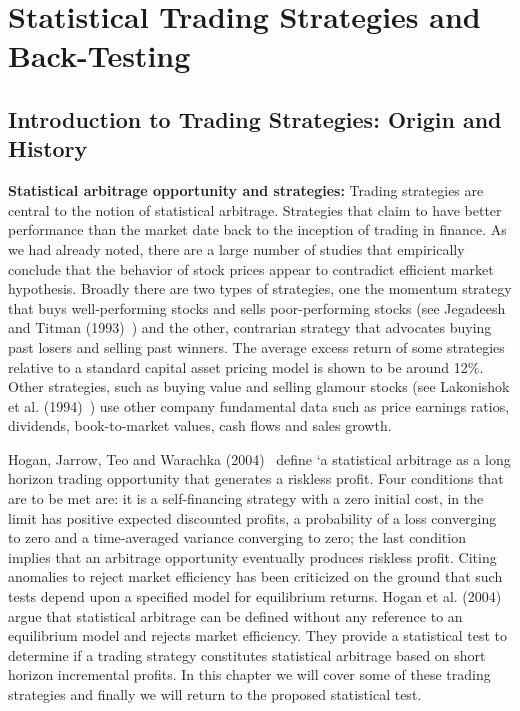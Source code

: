\chapter{Statistical Trading Strategies and Back-Testing}

\section{Introduction to Trading Strategies: Origin and History}

\noindent \textbf{Statistical arbitrage opportunity and strategies:} Trading strategies are central to the notion of statistical arbitrage. Strategies that claim to have better performance than the market date back to the inception of trading in finance. As we had already noted, there are a large number of studies that empirically conclude that the behavior of stock prices appear to contradict efficient market hypothesis. Broadly there are two types of strategies, one the momentum strategy that buys well-performing stocks and sells poor-performing stocks (see Jegadeesh and Titman (1993)~\cite{JeTit}) and the other, contrarian strategy that advocates buying past losers and selling past winners. The average excess return of some strategies relative to a standard capital asset pricing model is shown to be around 12\%. Other strategies, such as buying value and selling glamour stocks (see Lakonishok et al. (1994)~\cite{Lako}) use other company fundamental data such as price earnings ratios, dividends, book-to-market values, cash flows and sales growth.


Hogan, Jarrow, Teo and Warachka (2004)~\cite{Hogan} define `a statistical arbitrage as a long horizon trading opportunity that generates a riskless profit. Four conditions that are to be met are: it is a self-financing strategy with a zero initial cost, in the limit has positive expected discounted profits, a probability of a loss converging to zero and a time-averaged variance converging to zero; the last condition implies that an arbitrage opportunity eventually produces riskless profit. Citing anomalies to reject  market efficiency has been criticized on the ground that such tests depend upon a specified model for equilibrium returns. Hogan et al. (2004)~\cite{Hogan} argue that statistical arbitrage can be defined without any reference to an equilibrium model and rejects market efficiency. They provide a statistical test to determine if a trading strategy constitutes statistical arbitrage based on short horizon incremental profits. In this chapter we will cover some of these trading strategies and finally we will return to the proposed statistical test.


